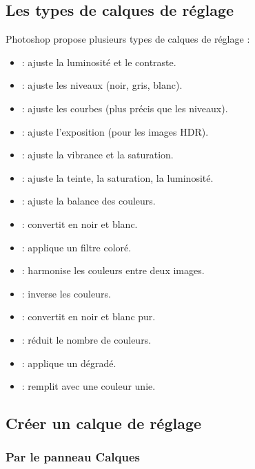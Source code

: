 \subsection{Les types de calques de réglage}

Photoshop propose plusieurs types de calques de réglage :

\begin{itemize}
    \item {} : ajuste la luminosité et le contraste.
    \item {} : ajuste les niveaux (noir, gris, blanc).
    \item {} : ajuste les courbes (plus précis que les niveaux).
    \item {} : ajuste l'exposition (pour les images HDR).
    \item {} : ajuste la vibrance et la saturation.
    \item {} : ajuste la teinte, la saturation, la luminosité.
    \item {} : ajuste la balance des couleurs.
    \item {} : convertit en noir et blanc.
    \item {} : applique un filtre coloré.
    \item {} : harmonise les couleurs entre deux images.
    \item {} : inverse les couleurs.
    \item {} : convertit en noir et blanc pur.
    \item {} : réduit le nombre de couleurs.
    \item {} : applique un dégradé.
    \item {} : remplit avec une couleur unie.
\end{itemize}

\subsection{Créer un calque de réglage}

\subsubsection{Par le panneau Calques}

